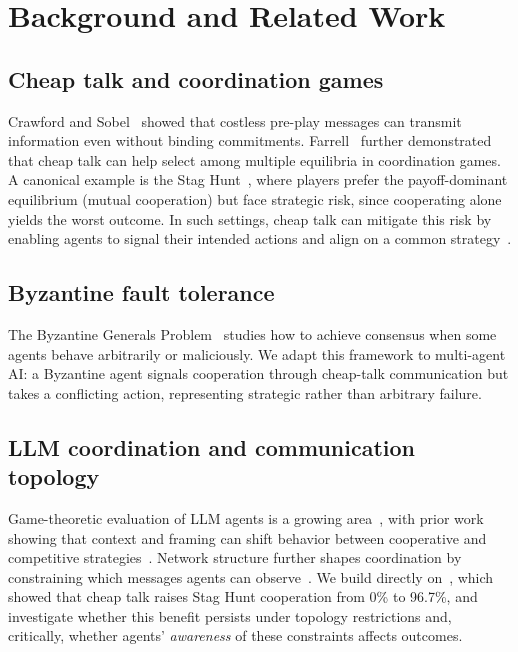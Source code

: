 \documentclass[runningheads]{llncs}
\begin{document}
\section{Background and Related Work}\label{sec:background}


\subsection{Cheap talk and coordination games}
Crawford and Sobel~\cite{crawford1982strategic} showed that costless pre-play messages can transmit information even without binding commitments. Farrell~\cite{farrell1987cheap} further demonstrated that cheap talk can help select among multiple equilibria in coordination games.
A canonical example is the Stag Hunt~\cite{skyrms2004stag}, where players prefer the payoff-dominant equilibrium (mutual cooperation) but face strategic risk, since cooperating alone yields the worst outcome.
In such settings, cheap talk can mitigate this risk by enabling agents to signal their intended actions and align on a common strategy~\cite{farrell1996cheap}.

\subsection{Byzantine fault tolerance}
The Byzantine Generals Problem~\cite{lamport1982byzantine} studies how to achieve consensus when some agents behave arbitrarily or maliciously.
We adapt this framework to multi-agent AI: a Byzantine agent signals cooperation through cheap-talk communication but takes a conflicting action, representing strategic rather than arbitrary failure.

\subsection{LLM coordination and communication topology}
Game-theoretic evaluation of LLM agents is a growing area~\cite{sun2025survey}, with prior work showing that context and framing can shift behavior between cooperative and competitive strategies~\cite{montrealethics_framing,huang2025gama_bench,guo2024investigation}.
Network structure further shapes coordination by constraining which messages agents can observe~\cite{jackson2008social}.
We build directly on~\cite{madmoun2026communication}, which showed that cheap talk raises Stag Hunt cooperation from 0\% to 96.7\%, and investigate whether this benefit persists under topology restrictions and, critically, whether agents' \emph{awareness} of these constraints affects outcomes.
\end{document}
